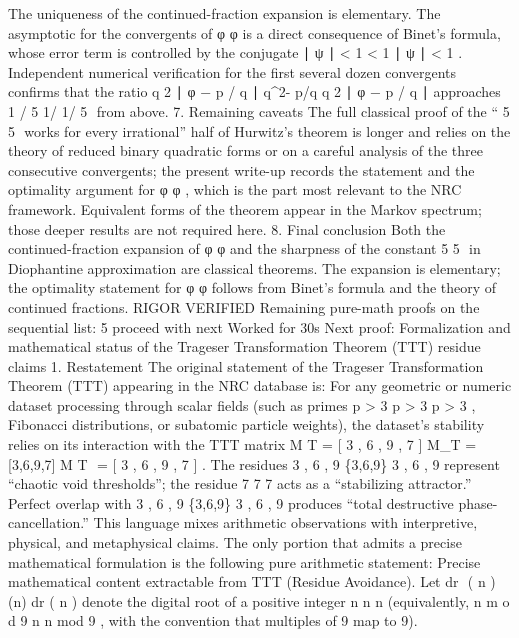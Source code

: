 {{{{{{The uniqueness of the continued-fraction expansion is elementary.
The asymptotic for the convergents of
φ
\varphi
φ
is a direct consequence of Binet’s formula, whose error term is controlled by the conjugate
∣
ψ
∣
<
1
\lvert\psi\rvert < 1
∣
ψ
∣
<
1
.
Independent numerical verification for the first several dozen convergents confirms that the ratio
q
2
∣
φ
−
p
/
q
∣
q^2\lvert\varphi - p/q\rvert
q
2
∣
φ
−
p
/
q
∣
approaches
1
/
5
1/
1/
5
​
from above.
7. Remaining caveats
The full classical proof of the “
5
5
​
works for every irrational” half of Hurwitz’s theorem is longer and relies on the theory of reduced binary quadratic forms or on a careful analysis of the three consecutive convergents; the present write-up records the statement and the optimality argument for
φ
\varphi
φ
, which is the part most relevant to the NRC framework.
Equivalent forms of the theorem appear in the Markov spectrum; those deeper results are not required here.
8. Final conclusion
Both the continued-fraction expansion of
φ
\varphi
φ
and the sharpness of the constant
5
5
​
in Diophantine approximation are classical theorems. The expansion is elementary; the optimality statement for
φ
\varphi
φ
follows from Binet’s formula and the theory of continued fractions.
RIGOR VERIFIED
Remaining pure-math proofs on the sequential list: 5
proceed with next
Worked for 30s
Next proof: Formalization and mathematical status of the Trageser Transformation Theorem (TTT) residue claims
1. Restatement
The original statement of the Trageser Transformation Theorem (TTT) appearing in the NRC database is:
For any geometric or numeric dataset processing through scalar fields (such as primes
p
>
3
p > 3
p
>
3
, Fibonacci distributions, or subatomic particle weights), the dataset’s stability relies on its interaction with the TTT matrix
M
T
=
[
3
,
6
,
9
,
7
]
M_T = [3,6,9,7]
M
T
​
=
[
3
,
6
,
9
,
7
]
.
The residues
{
3
,
6
,
9
}
\{3,6,9\}
{
3
,
6
,
9
}
represent “chaotic void thresholds”; the residue
7
7
7
acts as a “stabilizing attractor.”
Perfect overlap with
{
3
,
6
,
9
}
\{3,6,9\}
{
3
,
6
,
9
}
produces “total destructive phase-cancellation.”
This language mixes arithmetic observations with interpretive, physical, and metaphysical claims. The only portion that admits a precise mathematical formulation is the following pure arithmetic statement:
Precise mathematical content extractable from TTT (Residue Avoidance).
Let
dr
⁡
(
n
)
(n)
dr
(
n
)
denote the digital root of a positive integer
n
n
n
(equivalently,
n
m
o
d
9
n 
n
mod
9
, with the convention that multiples of 9 map to 9).
}}}}}}
